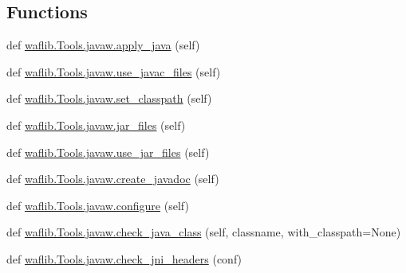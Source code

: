 \subsection*{Functions}
\begin{DoxyCompactItemize}
\item 
def \hyperlink{namespacewaflib_1_1_tools_1_1javaw_ac199170f2d825ba6563c59c3bd93c898}{waflib.\+Tools.\+javaw.\+apply\+\_\+java} (self)
\item 
def \hyperlink{namespacewaflib_1_1_tools_1_1javaw_af6ba463843a18b6c3bde4c507f6a6654}{waflib.\+Tools.\+javaw.\+use\+\_\+javac\+\_\+files} (self)
\item 
def \hyperlink{namespacewaflib_1_1_tools_1_1javaw_a9015681f9dcfa3b4e80782ca246368ed}{waflib.\+Tools.\+javaw.\+set\+\_\+classpath} (self)
\item 
def \hyperlink{namespacewaflib_1_1_tools_1_1javaw_a557eb69ce06510674c61863be0eb2f36}{waflib.\+Tools.\+javaw.\+jar\+\_\+files} (self)
\item 
def \hyperlink{namespacewaflib_1_1_tools_1_1javaw_a496633c2b59e5d16289419ba27b18e8d}{waflib.\+Tools.\+javaw.\+use\+\_\+jar\+\_\+files} (self)
\item 
def \hyperlink{namespacewaflib_1_1_tools_1_1javaw_a55269df6bcde18d795800b8f27857346}{waflib.\+Tools.\+javaw.\+create\+\_\+javadoc} (self)
\item 
def \hyperlink{namespacewaflib_1_1_tools_1_1javaw_a9a5bcdc227e3a524810c87bd1dc26b3f}{waflib.\+Tools.\+javaw.\+configure} (self)
\item 
def \hyperlink{namespacewaflib_1_1_tools_1_1javaw_addfef2e4d74b783f1c3633872f1b3fcb}{waflib.\+Tools.\+javaw.\+check\+\_\+java\+\_\+class} (self, classname, with\+\_\+classpath=None)
\item 
def \hyperlink{namespacewaflib_1_1_tools_1_1javaw_a239ae8003166984f2141e9c2f9d58366}{waflib.\+Tools.\+javaw.\+check\+\_\+jni\+\_\+headers} (conf)
\end{DoxyCompactItemize}
